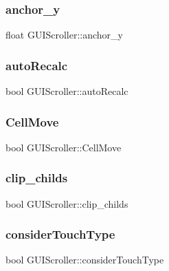 \subsubsection{\texorpdfstring{anchor\+\_\+y}{anchor\_y}}
{\footnotesize\ttfamily float G\+U\+I\+Scroller\+::anchor\+\_\+y}

\hypertarget{class_g_u_i_scroller_a3d8c0d83c54ae3b72f17bfce3f7baf9e}{}\label{class_g_u_i_scroller_a3d8c0d83c54ae3b72f17bfce3f7baf9e} 
\subsubsection{\texorpdfstring{auto\+Recalc}{autoRecalc}}
{\footnotesize\ttfamily bool G\+U\+I\+Scroller\+::auto\+Recalc}

\hypertarget{class_g_u_i_scroller_a531f10dde7250c6d41f071c5f4d0fbb1}{}\label{class_g_u_i_scroller_a531f10dde7250c6d41f071c5f4d0fbb1} 
\subsubsection{\texorpdfstring{Cell\+Move}{CellMove}}
{\footnotesize\ttfamily bool G\+U\+I\+Scroller\+::\+Cell\+Move}

\hypertarget{class_g_u_i_scroller_a66c2d35890c490d5c85fd73d995a1009}{}\label{class_g_u_i_scroller_a66c2d35890c490d5c85fd73d995a1009} 
\subsubsection{\texorpdfstring{clip\+\_\+childs}{clip\_childs}}
{\footnotesize\ttfamily bool G\+U\+I\+Scroller\+::clip\+\_\+childs}

\hypertarget{class_g_u_i_scroller_a6ed12ea2592f0bf03c590a4e6c24d361}{}\label{class_g_u_i_scroller_a6ed12ea2592f0bf03c590a4e6c24d361} 
\subsubsection{\texorpdfstring{consider\+Touch\+Type}{considerTouchType}}
{\footnotesize\ttfamily bool G\+U\+I\+Scroller\+::consider\+Touch\+Type}

